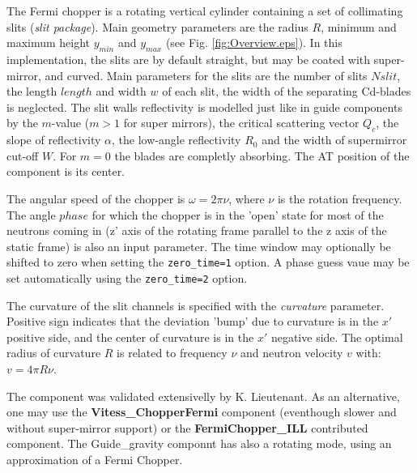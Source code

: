 The Fermi chopper is a rotating vertical cylinder containing a set of collimating slits (\emph{slit package}). Main geometry parameters are the radius $R$, minimum and maximum height $y_{min}$ and $y_{max}$ (see Fig. \ref{fig:Overview.eps}).
In this implementation, the slits are by default straight, but may be coated with super-mirror, and curved. Main parameters for the slits are the number of slits $Nslit$, the length $length$ and width $w$ of each slit, the width of the separating Cd-blades is neglected. The slit walls reflectivity is modelled just like in guide components by the $m$-value ($m > 1$ for super mirrors), the critical scattering vector $Q_c$, the slope of reflectivity $\alpha$, the low-angle reflectivity $R_0$ and the width of supermirror cut-off $W$. For $m=0$ the blades are completly absorbing. The AT position of the component is its center.

The angular speed of the chopper is $\omega = 2\pi \nu$, where $\nu$ is the rotation frequency. The angle $phase$ for which the chopper is in the 'open' state for most of the neutrons coming in (z' axis of the rotating frame parallel to the z axis of the static frame) is also an input parameter. The time window may optionally be shifted to zero when setting the \verb+zero_time=1+ option. A phase guess vaue may be set automatically using the \verb+zero_time=2+ option.

The curvature of the slit channels is specified with the {\it curvature} parameter. Positive sign indicates that the deviation 'bump' due to curvature is in the $x'$ positive side, and the center of curvature is in the $x'$ negative side. The optimal radius of curvature $R$ is related to frequency $\nu$ and neutron velocity $v$ with: $v=4 \pi R \nu$.

The component was validated extensivelly by K. Lieutenant. As an alternative, one may use the {\bf Vitess\_ChopperFermi} component (eventhough slower and without super-mirror support) or the {\bf FermiChopper\_ILL} contributed component. The Guide\_gravity componnt has also a rotating mode, using an approximation of a Fermi Chopper.

